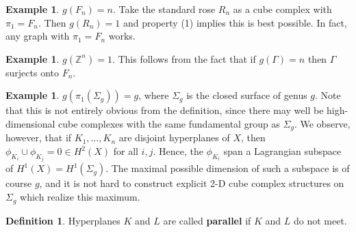\documentclass[11pt]{amsart}
\numberwithin{thm}{section}
\theoremstyle{remark}
\theoremstyle{definition}
\newtheorem{definition}[thm]{Definition}
\newtheorem{example}[thm]{Example}
\newcommand{\Z}{\mathbb{Z}}
\begin{document}
\begin{example} $g(F_n)=n$.  Take the standard rose $R_n$ as a cube complex with $\pi_1=F_n$.  Then $g(R_n)=1$ and property (1) implies this is best possible.  In fact, any graph with $\pi_1=F_n$ works.
\end{example}

\begin{example} $g(\Z^n)=1$.  This follows from the fact that if $g(\Gamma)=n$ then $\Gamma$ surjects onto $F_n$.  
\end{example}

\begin{example} $g(\pi_1(\Sigma_g))=g$, where $\Sigma_g$ is the closed surface of genus $g$.  Note that this is not entirely obvious from the definition, since there may well be high-dimensional cube complexes with the same fundamental group as $\Sigma_g$.  We observe, however, that if $K_1,\ldots, K_n$ are disjoint hyperplanes of $X$, then $\phi_{K_i}\cup\phi_{K_j}=0\in H^2(X)$ for all $i,j$.  Hence, the $\phi_{K_i}$ span a Lagrangian subspace of $H^1(X)=H^1(\Sigma_g)$.  The maximal possible dimension of such a subspace is of course $g$, and it is not hard to construct explicit 2-D cube complex structures on $\Sigma_g$ which realize this maximum. 
\end{example}

\begin{definition} Hyperplanes $K$ and $L$ are called \textbf{parallel} if $K$ and $L$ do not meet.  
\end{definition}
\end{document}
